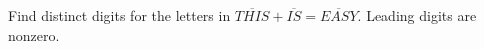 Find distinct digits for the letters in $\overline{THIS}+\overline{IS}=\overline{EASY}$. Leading digits are nonzero.

